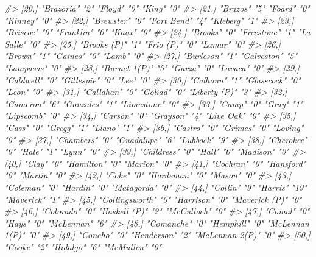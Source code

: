 \documentclass[
  12pt,
]{book}
\newenvironment{Shaded}{\begin{snugshade}}{\end{snugshade}}
\newcommand{\CommentTok}[1]{\textcolor[rgb]{0.37,0.37,0.37}{\textit{#1}}}
\begin{document}
\begin{Shaded}
\begin{Highlighting}[]
\CommentTok{\#> [20,] "Brazoria"      "2"  "Floyd"       "0"  "King"          "0" }
\CommentTok{\#> [21,] "Brazos"        "5"  "Foard"       "0"  "Kinney"        "0" }
\CommentTok{\#> [22,] "Brewster"      "0"  "Fort Bend"   "4"  "Kleberg"       "1" }
\CommentTok{\#> [23,] "Briscoe"       "0"  "Franklin"    "0"  "Knox"          "0" }
\CommentTok{\#> [24,] "Brooks"        "0"  "Freestone"   "1"  "La Salle"      "0" }
\CommentTok{\#> [25,] "Brooks (P)"    "1"  "Frio (P)"    "0"  "Lamar"         "0" }
\CommentTok{\#> [26,] "Brown"         "1"  "Gaines"      "0"  "Lamb"          "0" }
\CommentTok{\#> [27,] "Burleson"      "1"  "Galveston"   "5"  "Lampasas"      "0" }
\CommentTok{\#> [28,] "Burnet 1(P)"   "5"  "Garza"       "0"  "Lavaca"        "0" }
\CommentTok{\#> [29,] "Caldwell"      "0"  "Gillespie"   "0"  "Lee"           "0" }
\CommentTok{\#> [30,] "Calhoun"       "1"  "Glasscock"   "0"  "Leon"          "0" }
\CommentTok{\#> [31,] "Callahan"      "0"  "Goliad"      "0"  "Liberty (P)"   "3" }
\CommentTok{\#> [32,] "Cameron"       "6"  "Gonzales"    "1"  "Limestone"     "0" }
\CommentTok{\#> [33,] "Camp"          "0"  "Gray"        "1"  "Lipscomb"      "0" }
\CommentTok{\#> [34,] "Carson"        "0"  "Grayson"     "4"  "Live Oak"      "0" }
\CommentTok{\#> [35,] "Cass"          "0"  "Gregg"       "1"  "Llano"         "1" }
\CommentTok{\#> [36,] "Castro"        "0"  "Grimes"      "0"  "Loving"        "0" }
\CommentTok{\#> [37,] "Chambers"      "0"  "Guadalupe"   "6"  "Lubbock"       "9" }
\CommentTok{\#> [38,] "Cherokee"      "0"  "Hale"        "1"  "Lynn"          "0" }
\CommentTok{\#> [39,] "Childress"     "0"  "Hall"        "0"  "Madison"       "0" }
\CommentTok{\#> [40,] "Clay"          "0"  "Hamilton"    "0"  "Marion"        "0" }
\CommentTok{\#> [41,] "Cochran"       "0"  "Hansford"    "0"  "Martin"        "0" }
\CommentTok{\#> [42,] "Coke"          "0"  "Hardeman"    "0"  "Mason"         "0" }
\CommentTok{\#> [43,] "Coleman"       "0"  "Hardin"      "0"  "Matagorda"     "0" }
\CommentTok{\#> [44,] "Collin"        "9"  "Harris"      "19" "Maverick"      "1" }
\CommentTok{\#> [45,] "Collingsworth" "0"  "Harrison"    "0"  "Maverick (P)"  "0" }
\CommentTok{\#> [46,] "Colorado"      "0"  "Haskell (P)" "2"  "McCulloch"     "0" }
\CommentTok{\#> [47,] "Comal"         "0"  "Hays"        "0"  "McLennan"      "6" }
\CommentTok{\#> [48,] "Comanche"      "0"  "Hemphill"    "0"  "McLennan 1(P)" "0" }
\CommentTok{\#> [49,] "Concho"        "0"  "Henderson"   "2"  "McLennan 2(P)" "0" }
\CommentTok{\#> [50,] "Cooke"         "2"  "Hidalgo"     "6"  "McMullen"      "0" }

\end{Highlighting}
\end{Shaded}
\end{document}
